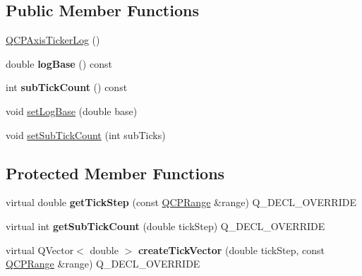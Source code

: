 \subsection*{Public Member Functions}
\begin{DoxyCompactItemize}
\item 
\hyperlink{classQCPAxisTickerLog_af3cb86ea5eef2023c0b96b5260c4cbdf}{Q\+C\+P\+Axis\+Ticker\+Log} ()
\item 
double {\bfseries log\+Base} () const \hypertarget{classQCPAxisTickerLog_abba2a2aead5551b433940fa39a53ca09}{}\label{classQCPAxisTickerLog_abba2a2aead5551b433940fa39a53ca09}

\item 
int {\bfseries sub\+Tick\+Count} () const \hypertarget{classQCPAxisTickerLog_ad7a648bfa6ee3ad33b1c43bd7b84e9ab}{}\label{classQCPAxisTickerLog_ad7a648bfa6ee3ad33b1c43bd7b84e9ab}

\item 
void \hyperlink{classQCPAxisTickerLog_ac6e3b4e03baea3816f898869ab9751ef}{set\+Log\+Base} (double base)
\item 
void \hyperlink{classQCPAxisTickerLog_ad51989c798c0cfd50936d77aac57c56a}{set\+Sub\+Tick\+Count} (int sub\+Ticks)
\end{DoxyCompactItemize}
\subsection*{Protected Member Functions}
\begin{DoxyCompactItemize}
\item 
virtual double {\bfseries get\+Tick\+Step} (const \hyperlink{classQCPRange}{Q\+C\+P\+Range} \&range) Q\+\_\+\+D\+E\+C\+L\+\_\+\+O\+V\+E\+R\+R\+I\+DE\hypertarget{classQCPAxisTickerLog_a57be974214a065d3247406331f02fa49}{}\label{classQCPAxisTickerLog_a57be974214a065d3247406331f02fa49}

\item 
virtual int {\bfseries get\+Sub\+Tick\+Count} (double tick\+Step) Q\+\_\+\+D\+E\+C\+L\+\_\+\+O\+V\+E\+R\+R\+I\+DE\hypertarget{classQCPAxisTickerLog_a352fef7ae68837acd26e35188aa86167}{}\label{classQCPAxisTickerLog_a352fef7ae68837acd26e35188aa86167}

\item 
virtual Q\+Vector$<$ double $>$ {\bfseries create\+Tick\+Vector} (double tick\+Step, const \hyperlink{classQCPRange}{Q\+C\+P\+Range} \&range) Q\+\_\+\+D\+E\+C\+L\+\_\+\+O\+V\+E\+R\+R\+I\+DE\hypertarget{classQCPAxisTickerLog_af8873a8d1d2b9392d8f7a73218c889ab}{}\label{classQCPAxisTickerLog_af8873a8d1d2b9392d8f7a73218c889ab}

\end{DoxyCompactItemize}
